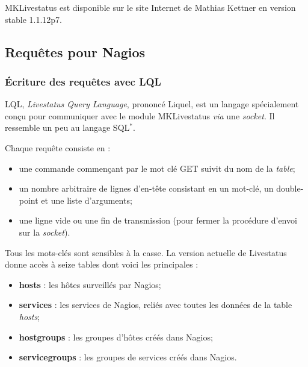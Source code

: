 \vspace{0.20cm}

MKLivestatus est disponible sur le site Internet\cite{biblio:siteMklivestatus} de Mathias Kettner en version stable 1.1.12p7.

\subsection{Requ\^etes pour Nagios}

\subsubsection{\'Ecriture des requ\^etes avec LQL}

LQL, \textit{Livestatus Query Language}, prononc\'e \og Liquel\fg, est un langage sp\'ecialement con\c{c}u pour communiquer avec le module MKLivestatus \textit{via} une \textit{socket}.
Il ressemble un peu au langage SQL$^*$.

\noindent Chaque requ\^ete consiste en :

\begin{itemize}
	\item une commande commen\c{c}ant par le mot cl\'e \textsf{GET} suivit du nom de la \textit{table};
	\item un nombre arbitraire de lignes d'en-t\^ete consistant en un mot-cl\'e, un double-point et une liste d'arguments;
	\item une ligne vide ou une fin de transmission (pour fermer la proc\'edure d'envoi sur la \textit{socket}).

\end{itemize}

\vspace{0.20cm}

Tous les mots-cl\'es sont sensibles \`a la casse. 
La version actuelle de Livestatus donne acc\`es \`a seize tables dont voici les principales :

\begin{itemize}
	\item \textbf{hosts} : les h\^otes surveill\'es par Nagios;
	\item \textbf{services} : les services de Nagios, reli\'es avec toutes les donn\'ees de la table \textit{hosts};
	\item \textbf{hostgroups} : les groupes d'h\^otes cr\'e\'es dans Nagios;
	\item \textbf{servicegroups} : les groupes de services cr\'e\'es dans Nagios.

\end{itemize}

